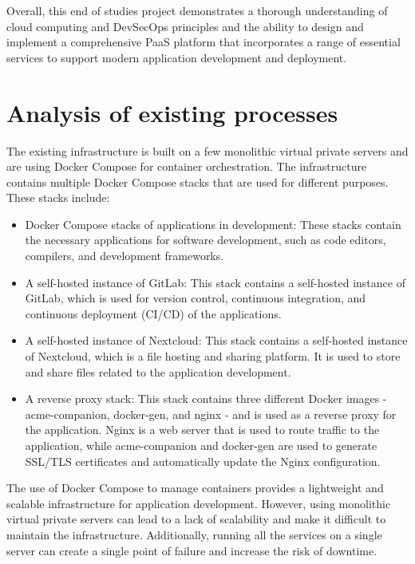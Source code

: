Overall, this end of studies project demonstrates a thorough understanding of cloud computing and DevSecOps principles and the ability to design and implement a comprehensive PaaS platform that incorporates a range of essential services to support modern application development and deployment. 

\section{Analysis of existing processes }

The existing infrastructure is built on a few monolithic virtual private servers and are using Docker Compose for container orchestration. The infrastructure contains multiple Docker Compose stacks that are used for different purposes. These stacks include: 
\begin{itemize}[label={--}]
\item Docker Compose stacks of applications in development: These stacks contain the necessary applications for software development, such as code editors, compilers, and development frameworks. 

\item A self-hosted instance of GitLab: This stack contains a self-hosted instance of GitLab, which is used for version control, continuous integration, and continuous deployment (CI/CD) of the applications. 

\item A self-hosted instance of Nextcloud: This stack contains a self-hosted instance of Nextcloud, which is a file hosting and sharing platform. It is used to store and share files related to the application development. 

\item A reverse proxy stack: This stack contains three different Docker images - acme-companion, docker-gen, and nginx - and is used as a reverse proxy for the application. Nginx is a web server that is used to route traffic to the application, while acme-companion and docker-gen are used to generate SSL/TLS certificates and automatically update the Nginx configuration. 
\end{itemize}

The use of Docker Compose to manage containers provides a lightweight and scalable infrastructure for application development. However, using monolithic virtual private servers can lead to a lack of scalability and make it difficult to maintain the infrastructure. Additionally, running all the services on a single server can create a single point of failure and increase the risk of downtime. 

